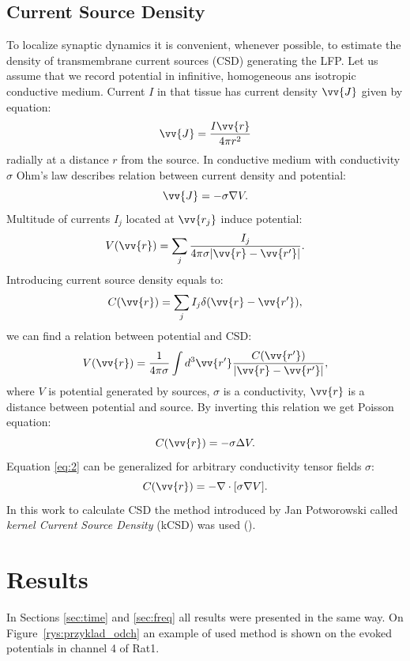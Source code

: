 \documentclass{pracalicmgr}
\begin{document}
   \section{Current Source Density}
   To localize synaptic dynamics it is convenient, whenever possible, to estimate the density of transmembrane current sources (CSD) generating the LFP. Let us assume that we record potential in infinitive, homogeneous ans isotropic conductive medium. Current $I$ in that tissue has current density $\vv{J}$ given by equation:
   \begin{equation}
   \vv{J}= \frac{I \vv{r}}{4\pi r^2}
   \end{equation}
   radially at a distance $r$ from the source. In conductive medium with conductivity $\sigma$ Ohm's law describes relation between current density and potential:
   \begin{equation}
   \vv{J}=-\sigma \nabla V.
   \end{equation}
   Multitude of currents $I_j$ located at $\vv{r_j}$ induce potential:
   \begin{equation}
   V(\vv{r})=\sum_{j} \frac{I_j}{4 \pi \sigma |\vv{r}-\vv{r'}|} .
   \end{equation}
   Introducing current source density equals to:
   \begin{equation}
   C(\vv{r})=\sum_{j} I_j \delta (\vv{r}-\vv{r'}),
   \end{equation}
   we can find a relation between potential and CSD:
   \begin{equation}
   V(\vv{r})=\frac{1}{4\pi\sigma}\int d^3 \vv{r'} \frac{C(\vv{r'})}{|\vv{r}-\vv{r'}|},
   \end{equation}
   where $V$ is potential generated by sources, $\sigma$ is a conductivity, $\vv{r}$ is a distance between potential and source. By inverting this relation we get Poisson equation:
   \begin{equation}
   C(\vv{r})=-\sigma \Delta V.
   \label{eq:2}
   \end{equation}
   Equation \ref{eq:2} can be generalized for arbitrary conductivity tensor fields $\sigma$:
   \begin{equation}
   C(\vv{r})=-\nabla \cdot [\sigma \nabla V].
   \end{equation}
   In this work to calculate CSD the method introduced by Jan Potworowski called \textit{kernel Current Source Density} (kCSD) was used (\cite{wojcik, potworowski}).
    
    \chapter{Results}
	In Sections \ref{sec:time} and \ref{sec:freq} all results were presented in the same way. On Figure~\ref{rys:przyklad_odch} an example of used method is shown on the evoked potentials in channel 4 of Rat1.
	
\end{document}
